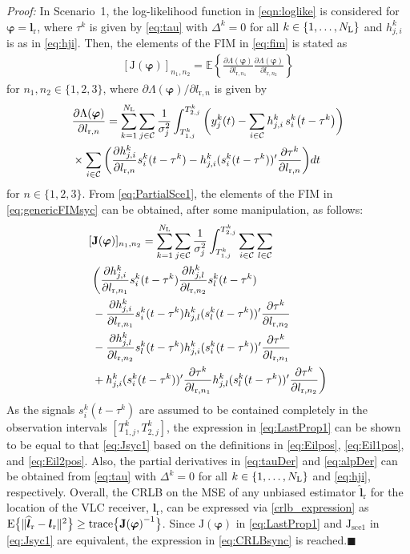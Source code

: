 \documentclass[10pt,twocolumn]{IEEEtran}
\newcommand{\rmE}{{\rm{E}}}
\newcommand{\NL}{N_{\rm{L}}}
\newcommand{\bvp}{{\boldsymbol{\varphi}}}
\newcommand{\mtC}{{\mathcal{C}}}
\newcommand{\expectation}{{\mathbb{E}}}
\newcommand{\lr}{{\boldsymbol{l}_{\mathrm{r}}}}
\newcommand{\lrh}{{\widehat{\boldsymbol{l}}_{\mathrm{r}}}}
\newcommand{\lrs}[1]{{l_{\mathrm{r},#1}}}
\newcommand{\Jsyn}{{\boldsymbol{\mathrm{J}}_{\mathrm{sce1}}}}
\newcommand{\Jv}{{\boldsymbol{\mathrm{J}}(\bvp)}}
\begin{document}
\indent\indent\textit{Proof:} In Scenario~1, the log-likelihood function in \eqref{eqn:loglike} is considered for $\bvp=\lr$, where $\tau^k$ is given by \eqref{eq:tau} with $\Delta^k=0$ for all $k\in\{1,\ldots,\NL\}$ and $h^k_{j,i}$ is as in \eqref{eq:hji}. Then, the elements of the FIM in \eqref{eq:fim} is stated as
\begin{gather}\label{eq:genericFIMsyc}
	[\Jv]_{n_1,n_2}=\expectation \left\{ \frac{\partial\Lambda(\bvp)}{\partial\lrs{n_1}}
	\frac{\partial\Lambda(\bvp)}{\partial\lrs{n_2}} \right\}
\end{gather}
for $n_1,n_2\in\{1,2,3\}$, where ${\partial\Lambda(\bvp)}/{\partial\lrs{n}}$ is given by
\begin{align}\nonumber
&\frac{\partial\Lambda(\bvp)}{\partial\lrs{n}}=
\sum_{k=1}^{\NL}\sum_{j\in\mtC} \frac{1}{\sigma_j^2} \int_{T^k_{1,j}}^{T^k_{2,j}}
\bigg(y^k_j(t)-\sum_{i\in\mtC}h^k_{j,i}\,s^k_i\big(t-\tau^k\big)\bigg)\\\label{eq:PartialSce1}
&\times\sum_{i\in\mtC}\bigg(\frac{{\partial h^k_{j,i}}}{{\partial \lrs{n}}} s^k_i(t - \tau^k) - h^k_{j,i} (s^k_i(t-\tau^k))'\frac{{\partial \tau^k}}{{\partial \lrs{n}}} \bigg) dt \end{align}
for $n\in\{1,2,3\}$. From \eqref{eq:PartialSce1}, the elements of the FIM in \eqref{eq:genericFIMsyc} can be obtained, after some manipulation, as follows:
\begin{align}\nonumber
	&[\Jv]_{n_1,n_2}=\sum_{k=1}^{\NL}\sum_{j\in\mtC} \frac{1}{\sigma_j^2}\int_{T^k_{1,j}}^{T^k_{2,j}}
\sum_{i\in\mtC}\sum_{l\in\mtC}\\\nonumber
&~\bigg(\frac{{\partial h^k_{j,i}}}{{\partial \lrs{n_1}}} s^k_i(t - \tau^k)
\frac{{\partial h^k_{j,l}}}{{\partial \lrs{n_2}}} s^k_l(t - \tau^k)
\\\nonumber&~-\frac{{\partial h^k_{j,i}}}{{\partial \lrs{n_1}}} s^k_i(t - \tau^k)
h^k_{j,l} (s^k_l(t-\tau^k))'\frac{{\partial \tau^k}}{{\partial \lrs{n_2}}}
\\\nonumber&~-\frac{{\partial h^k_{j,l}}}{{\partial \lrs{n_2}}} s^k_l(t - \tau^k)
h^k_{j,i} (s^k_i(t-\tau^k))'\frac{{\partial \tau^k}}{{\partial \lrs{n_1}}}
\\\label{eq:LastProp1}
&~+h^k_{j,i} (s^k_i(t-\tau^k))'\frac{{\partial \tau^k}}{{\partial \lrs{n_1}}}
h^k_{j,l} (s^k_l(t-\tau^k))'\frac{{\partial \tau^k}}{{\partial \lrs{n_2}}}\bigg)
\end{align}
As the signals $s_i^k(t-\tau^k)$ are assumed to be contained completely in the observation intervals $[T^k_{1,j},T^k_{2,j}]$, the expression in \eqref{eq:LastProp1} can be shown to be equal to that \eqref{eq:Jsyc1} based on the definitions in \eqref{eq:Eilpos}, \eqref{eq:Eil1pos}, and \eqref{eq:Eil2pos}. Also, the partial derivatives in \eqref{eq:tauDer} and \eqref{eq:alpDer} can be obtained from \eqref{eq:tau} with $\Delta^k=0$ for all $k\in\{1,\ldots,\NL\}$ and \eqref{eq:hji}, respectively. Overall, the CRLB on the MSE of any unbiased estimator $\lrh$ for the location of the VLC receiver, $\lr$, can be expressed via \eqref{crlb_expression} as $\rmE\big\{\|\lrh - \lr \|^2\big\}\geq {\rm{trace}}\big\{  \Jv^{-1} \big\}$. Since $\Jv$ in \eqref{eq:LastProp1} and $\Jsyn$ in \eqref{eq:Jsyc1} are equivalent, the
expression in \eqref{eq:CRLBsync} is reached.\hfill$\blacksquare$
\end{document}
